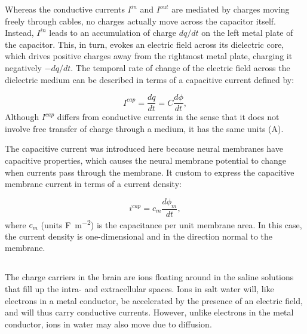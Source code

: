 Whereas the conductive currents $I^{in}$ and $I^{out}$ are mediated by charges moving freely through cables, no charges actually move across the capacitor itself. Instead, $I^{in}$ leads to an accumulation of charge $dq/dt$ on the left metal plate of the capacitor. This, in turn, evokes an electric field across its dielectric core, which drives positive charges away from the rightmost metal plate, charging it negatively $-dq/dt$. The temporal rate of change of the electric field across the dielectric medium can be described in terms of a capacitive current defined by:

\begin{equation}
I^{cap} = \frac{dq}{dt} = C\frac{d\phi}{dt}, 
\label{eq:Basics:Icap}
\end{equation}
Although $I^{cap}$ differs from conductive currents in the sense that it does not involve free transfer of charge through a medium, it has the same units (A). 

The capacitive current was introduced here because neural membranes have capacitive properties, which causes the neural membrane potential to change when currents pass through the membrane. It custom to express the capacitive membrane current in terms of a current density: 

\begin{equation}
i^{cap} = c_m\frac{d\phi_m}{dt}, 
\label{eq:Basics:Icap_mem}
\end{equation}
where $c_m$ (units \si{\farad\per\square\metre}) is the capacitance per unit membrane area. In this case, the current density is one-dimensional and in the direction normal to the membrane.


\subsection{}
\label{sec:Basics:DiffusiveCurrent} 
 
The charge carriers in the brain are ions floating around in the saline solutions that fill up the intra- and extracellular spaces. Ions in salt water will, like electrons in a metal conductor, be accelerated by the presence of an electric field, and will thus carry conductive currents. However, unlike electrons in the metal conductor, ions in water may also move due to diffusion. 

